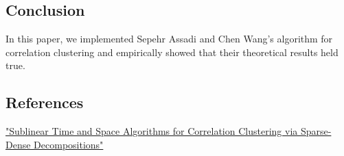 \documentclass[
]{article}
\begin{document}
\hypertarget{conclusion}{%
\subsection{Conclusion}\label{conclusion}}

In this paper, we implemented Sepehr Assadi and Chen
Wang's algorithm for correlation clustering and
empirically showed that their theoretical results held true.

\hypertarget{references}{%
\subsection{References}\label{references}}

\href{https://doi.org/10.48550/arxiv.2109.14528}{"Sublinear Time and
Space Algorithms for Correlation Clustering via Sparse-Dense
Decompositions"}
\end{document}
